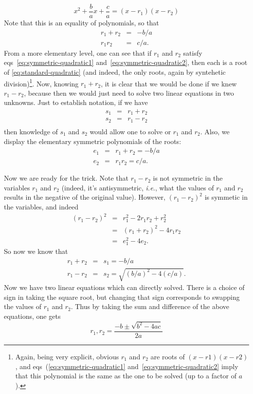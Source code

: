 \documentclass{article}
\begin{document}
\begin{equation}
  x^2 + \frac{b}{a} x + \frac{c}{a} = (x - r_1) (x - r_2)
\end{equation}
 Note that this is
an equality of polynomials, so that
\begin{eqnarray}
 r_1 + r_2 & = & -b/a 
\label{eq:symmetric-quadratic1} \\
 r_1 r_2 & =  & c/a.
\label{eq:symmetric-quadratic2}
\end{eqnarray}
From a more elementary level, one can see that if
$r_1$ and $r_2$ satisfy eqs~\ref{eq:symmetric-quadratic1} 
and~\ref{eq:symmetric-quadratic2}, then each is a root
of \ref{eq:standard-quadratic} (and indeed, the only roots, 
again by syntehetic division)\footnote{Again, being very explicit,
obvious $r_1$ and $r_2$ are roots of $(x-r1)(x-r2)$, and 
eqs~(\ref{eq:symmetric-quadratic1} and~\ref{eq:symmetric-quadratic2} imply
that this polynomial is the same as the one to be solved (up to a 
factor of $a$).}.
Now, knowing $r_1 + r_2$, it is clear that we would be done
if we knew $r_1 - r_2$, because then we would just need to
solve two linear equations in two unknowns.  Just to establish
notation, if we have
\begin{eqnarray}
s_1 & = & r_1 + r_2 \\
s_2 & = & r_1 - r_2 \\
\end{eqnarray}
then knowledge of $s_1$ and $s_2$ would allow one to solve
or $r_1$ and $r_2$.
Also, we display the elementary symmetric polynomials of
the roots:
\begin{eqnarray}
e_1 & = & r_1 + r_2 = -b/a \\
e_2 & = & r_1 r_2 = c/a.
\end{eqnarray}

Now we are ready for the trick.  Note that $r_1 - r_2$ is not symmetric
in the variables $r_1$ and $r_2$ (indeed, it's antisymmetric, \emph{i.e.},
what the values of $r_1$ and $r_2$ results in the negative of the
original value).  However, $(r_1 - r_2)^2$ is symmetic in the variables,
and indeed
\begin{eqnarray}
\left( r_1 - r_2 \right)^2 & = & r_1^2 - 2 r_1 r_2 + r_2^2 \\
 & = & \left( r_1 + r_2 \right)^2 - 4 r_1 r_2 \\ 
 & = & e_1 ^ 2 - 4 e_2.
\end{eqnarray}
So now we know that
\begin{eqnarray}
  r_1 + r_2 & = & s_1 = -b/a \\
  r_1 - r_2 & = & s_2 = \sqrt{(b/a)^2 - 4(c/a)}.
\end{eqnarray}
Now we have two linear equations which can directly solved.
There is a choice of sign in taking the square root, but
changing that sign corresponds to swapping the values of
$r_1$ and $r_2$.  Thus by taking the sum and difference
of the above equations, one gets
\begin{equation}
  r_1, r_2 = \frac{-b \pm \sqrt{b^2 - 4 a c}}{2a}
\end{equation}
\end{document}
